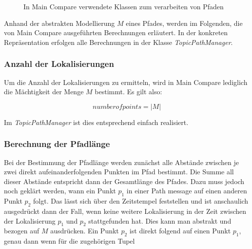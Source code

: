 \begin{figure}[t]
  \begin{center}
  \end{center}
  \caption{In Main Compare verwendete Klassen zum verarbeiten von Pfaden}
  \label{fig:topicpathrelated}
\end{figure}

Anhand der abstrakten Modellierung $M$ eines Pfades, werden im Folgenden, die von
Main Compare ausgeführten Berechnungen erläutert. In der konkreten
Repräsentation erfolgen alle Berechnungen in der Klasse \textit{TopicPathManager}. 

\subsubsection{Anzahl der Lokalisierungen}
Um die Anzahl der Lokalisierungen zu ermitteln, wird in Main Compare lediglich die
Mächtigkeit der Menge $M$ bestimmt. Es gilt also:

\begin{equation*}
  \label{eqn:numofpoints}
  number of points = \vert M \vert
\end{equation*}

Im \textit{TopicPathManager} ist dies entsprechend einfach realisiert.

\subsubsection{Berechnung der Pfadlänge}
Bei der Bestimmung der Pfadlänge werden zunächst alle Abstände zwischen je
zwei direkt aufeinanderfolgenden Punkten im Pfad bestimmt. Die Summe all dieser
Abstände entspricht dann der Gesamtlänge des Pfades. Dazu muss jedoch noch
geklärt werden, wann ein Punkt $p_1$ in einer Path message auf einen anderen
Punkt $p_2$ folgt. Das lässt sich über den Zeitstempel feststellen und ist
anschaulich ausgedrückt dann der Fall, wenn keine weitere Lokalisierung in
der Zeit zwischen der Lokalisierung $p_1$ und $p_2$ stattgefunden hat. Dies
kann man abstrakt und bezogen auf $M$ ausdrücken.  Ein Punkt $p_2$ ist direkt
folgend auf einen Punkt $p_1$, genau dann wenn für die zugehörigen Tupel

